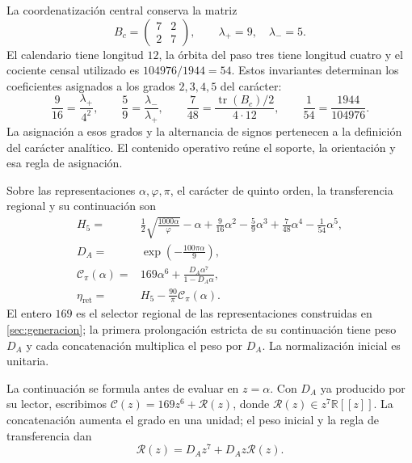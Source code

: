 La coordenatización central conserva la matriz
\[
 B_c=\begin{pmatrix}7&2\\2&7\end{pmatrix},
 \qquad\lambda_+=9,\quad\lambda_-=5.
\]
El calendario tiene longitud \(12\), la órbita del paso tres tiene
longitud cuatro y el cociente censal utilizado es
\(104976/1944=54\). Estos invariantes determinan los coeficientes
asignados a los grados \(2,3,4,5\) del carácter:
\begin{equation}
 \frac9{16}=\frac{\lambda_+}{4^2},\qquad
 \frac59=\frac{\lambda_-}{\lambda_+},\qquad
 \frac7{48}=\frac{\operatorname{tr}(B_c)/2}{4\cdot12},
 \qquad
 \frac1{54}=\frac{1944}{104976}.
 \label{iv:action:coeficientes}
\end{equation}
La asignación a esos grados y la alternancia de signos pertenecen
a la definición del carácter analítico. El contenido operativo
reúne el soporte, la orientación y esa regla de asignación.

\begin{definition}
\label{iv:action:lectores}
Sobre las representaciones \(\alpha,\varphi,\pi\), el carácter de
quinto orden, la transferencia regional y su continuación son
\begin{align}
 H_5={}&\frac12\sqrt{\frac{1000\alpha}{\varphi}}-\alpha
       +\frac9{16}\alpha^2-\frac59\alpha^3
       +\frac7{48}\alpha^4-\frac1{54}\alpha^5,
       \label{iv:action:h5}\\
 D_A={}&\exp\!\left(-\frac{100\pi\alpha}{9}\right),
       \label{iv:action:da}\\
 \mathcal C_\pi(\alpha)={}&169\alpha^6+
       \frac{D_A\alpha^7}{1-D_A\alpha},
       \label{iv:action:cpi}\\
 \eta_{\mathrm{ret}}={}&H_5-\frac{90}{\pi}\mathcal C_\pi(\alpha).
       \label{iv:action:eta-ret}
\end{align}
El entero \(169\) es el selector regional de las representaciones
construidas en \ref{sec:generacion}; la primera prolongación estricta de su continuación
tiene peso \(D_A\) y cada concatenación multiplica el peso por
\(D_A\). La normalización inicial es unitaria.
\end{definition}

La continuación se formula antes de evaluar en \(z=\alpha\).
Con \(D_A\) ya producido por su lector, escribimos
\(\mathscr C(z)=169z^6+\mathscr R(z)\), donde
\(\mathscr R(z)\in z^7\mathbb R[[z]]\).
La concatenación aumenta el grado en una unidad; el peso inicial
y la regla de transferencia dan
\begin{equation}
 \mathscr R(z)=D_Az^7+D_Az\mathscr R(z).
 \label{iv:action:renovacion}
\end{equation}

